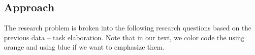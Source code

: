 %

\subsection{Approach}
The research problem is broken into the following research questions based on the previous data -- task elaboration.  Note that in our text, we color code the  using orange and  using blue if we want to emphasize them.

